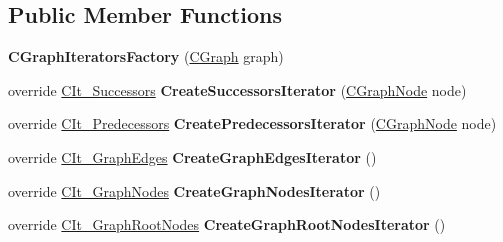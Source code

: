 \subsection*{Public Member Functions}
\begin{DoxyCompactItemize}
\item 
\hypertarget{class_graph_library_1_1_c_graph_iterators_factory_adcbb1187f8ff64e6eac58d04b37ad928}{}{\bfseries C\+Graph\+Iterators\+Factory} (\hyperlink{class_graph_library_1_1_c_graph}{C\+Graph} graph)\label{class_graph_library_1_1_c_graph_iterators_factory_adcbb1187f8ff64e6eac58d04b37ad928}

\item 
\hypertarget{class_graph_library_1_1_c_graph_iterators_factory_aa73589aa48093ff9f40695e11c2fca43}{}override \hyperlink{class_graph_library_1_1_c_it___successors}{C\+It\+\_\+\+Successors} {\bfseries Create\+Successors\+Iterator} (\hyperlink{class_graph_library_1_1_c_graph_node}{C\+Graph\+Node} node)\label{class_graph_library_1_1_c_graph_iterators_factory_aa73589aa48093ff9f40695e11c2fca43}

\item 
\hypertarget{class_graph_library_1_1_c_graph_iterators_factory_a7c2263e641d6255778b4c7303317102d}{}override \hyperlink{class_graph_library_1_1_c_it___predecessors}{C\+It\+\_\+\+Predecessors} {\bfseries Create\+Predecessors\+Iterator} (\hyperlink{class_graph_library_1_1_c_graph_node}{C\+Graph\+Node} node)\label{class_graph_library_1_1_c_graph_iterators_factory_a7c2263e641d6255778b4c7303317102d}

\item 
\hypertarget{class_graph_library_1_1_c_graph_iterators_factory_a3eee9436be4f136da48e9fe708bb1116}{}override \hyperlink{class_graph_library_1_1_c_it___graph_edges}{C\+It\+\_\+\+Graph\+Edges} {\bfseries Create\+Graph\+Edges\+Iterator} ()\label{class_graph_library_1_1_c_graph_iterators_factory_a3eee9436be4f136da48e9fe708bb1116}

\item 
\hypertarget{class_graph_library_1_1_c_graph_iterators_factory_a4a5bdbb305ef3a13a9be4524a3fe3665}{}override \hyperlink{class_graph_library_1_1_c_it___graph_nodes}{C\+It\+\_\+\+Graph\+Nodes} {\bfseries Create\+Graph\+Nodes\+Iterator} ()\label{class_graph_library_1_1_c_graph_iterators_factory_a4a5bdbb305ef3a13a9be4524a3fe3665}

\item 
\hypertarget{class_graph_library_1_1_c_graph_iterators_factory_a789fbd1fef32e6bcb5418f32e42f01a5}{}override \hyperlink{class_graph_library_1_1_c_it___graph_root_nodes}{C\+It\+\_\+\+Graph\+Root\+Nodes} {\bfseries Create\+Graph\+Root\+Nodes\+Iterator} ()\label{class_graph_library_1_1_c_graph_iterators_factory_a789fbd1fef32e6bcb5418f32e42f01a5}


\end{DoxyCompactItemize}
